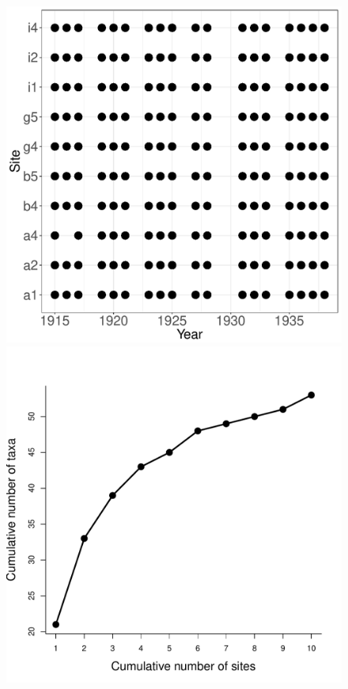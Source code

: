 \documentclass[11pt, oneside]{article}
\begin{document}
\begin{figure}[h!]
\includegraphics[scale = 0.4]{jrn-plants-compagnoni_spatiotemporal_sampling_effort.pdf}
\includegraphics[scale = 0.4]{jrn-plants-compagnoni_species_accumulation_space.pdf}

\end{figure}
\end{document}
